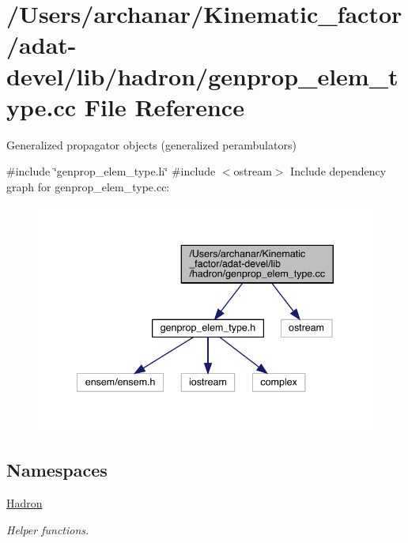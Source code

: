 \hypertarget{adat-devel_2lib_2hadron_2genprop__elem__type_8cc}{}\section{/\+Users/archanar/\+Kinematic\+\_\+factor/adat-\/devel/lib/hadron/genprop\+\_\+elem\+\_\+type.cc File Reference}
\label{adat-devel_2lib_2hadron_2genprop__elem__type_8cc}


Generalized propagator objects (generalized perambulators)  


{\ttfamily \#include \char`\"{}genprop\+\_\+elem\+\_\+type.\+h\char`\"{}}\newline
{\ttfamily \#include $<$ostream$>$}\newline
Include dependency graph for genprop\+\_\+elem\+\_\+type.\+cc\+:
\nopagebreak
\begin{figure}[H]
\begin{center}
\leavevmode
\includegraphics[width=340pt]{dd/dff/adat-devel_2lib_2hadron_2genprop__elem__type_8cc__incl}
\end{center}
\end{figure}
\subsection*{Namespaces}
\begin{DoxyCompactItemize}
\item 
 \mbox{\hyperlink{namespaceHadron}{Hadron}}
\begin{DoxyCompactList}\small\item\em Helper functions. \end{DoxyCompactList}\end{DoxyCompactItemize}
